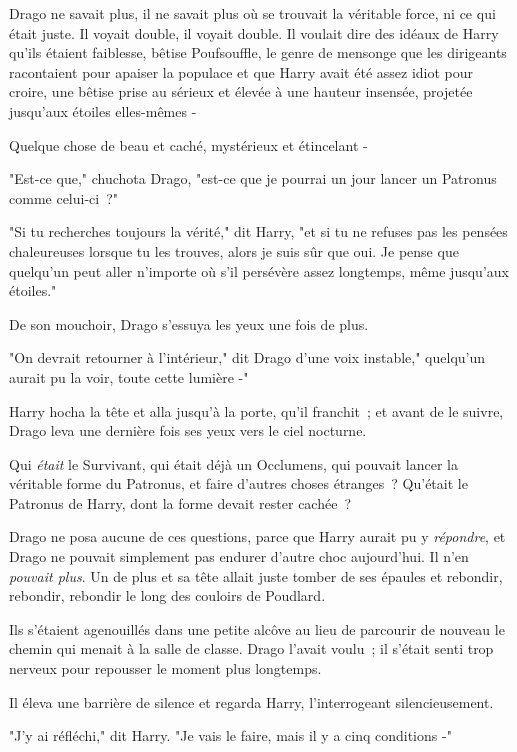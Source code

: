 Drago ne savait plus, il ne savait plus où se trouvait la véritable force, ni ce qui était juste. Il voyait double, il voyait double. Il voulait dire des idéaux de Harry qu'ils étaient faiblesse, bêtise Poufsouffle, le genre de mensonge que les dirigeants racontaient pour apaiser la populace et que Harry avait été assez idiot pour croire, une bêtise prise au sérieux et élevée à une hauteur insensée, projetée jusqu'aux étoiles elles-mêmes -

Quelque chose de beau et caché, mystérieux et étincelant -

"Est-ce que," chuchota Drago, "est-ce que je pourrai un jour lancer un Patronus comme celui-ci~?"

"Si tu recherches toujours la vérité," dit Harry, "et si tu ne refuses pas les pensées chaleureuses lorsque tu les trouves, alors je suis sûr que oui. Je pense que quelqu'un peut aller n'importe où s'il persévère assez longtemps, même jusqu'aux étoiles."

De son mouchoir, Drago s'essuya les yeux une fois de plus.

"On devrait retourner à l'intérieur," dit Drago d'une voix instable," quelqu'un aurait pu la voir, toute cette lumière -"

Harry hocha la tête et alla jusqu'à la porte, qu'il franchit~; et avant de le suivre, Drago leva une dernière fois ses yeux vers le ciel nocturne.

Qui \emph{était} le Survivant, qui était déjà un Occlumens, qui pouvait lancer la véritable forme du Patronus, et faire d'autres choses étranges~? Qu'était le Patronus de Harry, dont la forme devait rester cachée~?

Drago ne posa aucune de ces questions, parce que Harry aurait pu y \emph{répondre}, et Drago ne pouvait simplement pas endurer d'autre choc aujourd'hui. Il n'en \emph{pouvait plus}. Un de plus et sa tête allait juste tomber de ses épaules et rebondir, rebondir, rebondir le long des couloirs de Poudlard.

\later

Ils s'étaient agenouillés dans une petite alcôve au lieu de parcourir de nouveau le chemin qui menait à la salle de classe. Drago l'avait voulu~; il s'était senti trop nerveux pour repousser le moment plus longtemps.

Il éleva une barrière de silence et regarda Harry, l'interrogeant silencieusement.

"J'y ai réfléchi," dit Harry. "Je vais le faire, mais il y a cinq conditions -"

